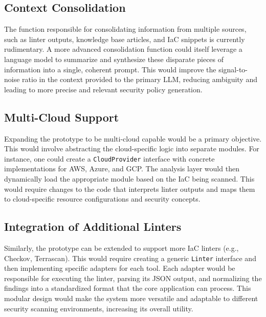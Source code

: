 \subsection{Context Consolidation}
The function responsible for consolidating information from multiple sources, such as linter outputs, knowledge base articles, and IaC snippets is currently rudimentary. A more advanced consolidation function could itself leverage a language model to summarize and synthesize these disparate pieces of information into a single, coherent prompt. This would improve the signal-to-noise ratio in the context provided to the primary LLM, reducing ambiguity and leading to more precise and relevant security policy generation.

\subsection{Multi-Cloud Support}
Expanding the prototype to be multi-cloud capable would be a primary objective. This would involve abstracting the cloud-specific logic into separate modules. For instance, one could create a \texttt{CloudProvider} interface with concrete implementations for AWS, Azure, and GCP. The analysis layer would then dynamically load the appropriate module based on the IaC being scanned. This would require changes to the code that interprets linter outputs and maps them to cloud-specific resource configurations and security concepts.

\subsection{Integration of Additional Linters}
\label{subsec:future_linters}
Similarly, the prototype can be extended to support more IaC linters (e.g., Checkov, Terrascan). This would require creating a generic \texttt{Linter} interface and then implementing specific adapters for each tool. Each adapter would be responsible for executing the linter, parsing its JSON output, and normalizing the findings into a standardized format that the core application can process. This modular design would make the system more versatile and adaptable to different security scanning environments, increasing its overall utility.